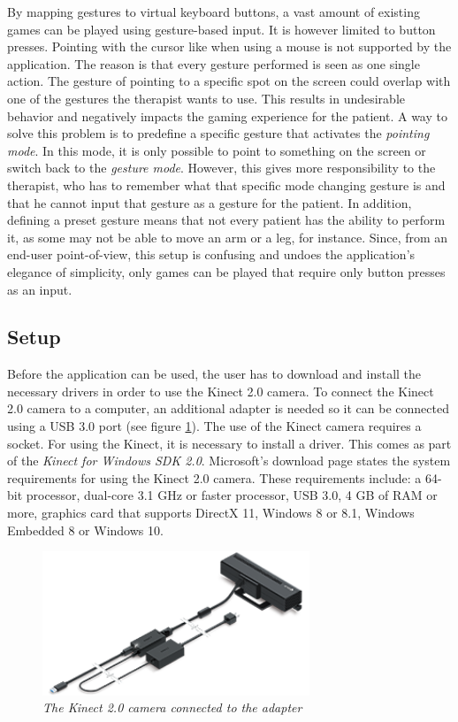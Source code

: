 By mapping gestures to virtual keyboard buttons, a vast amount of existing games can be played using gesture-based input. It is however limited to button presses. Pointing with the cursor like when using a mouse is not supported by the application. The reason is that every gesture performed is seen as one single action. The gesture of pointing to a specific spot on the screen could overlap with one of the gestures the therapist wants to use. This results in undesirable behavior and negatively impacts the gaming experience for the patient. A way to solve this problem is to predefine a specific gesture that activates the \emph{pointing mode}. In this mode, it is only possible to point to something on the screen or switch back to the \emph{gesture mode}. However, this gives more responsibility to the therapist, who has to remember what that specific mode changing gesture is and that he cannot input that gesture as a gesture for the patient. In addition, defining a preset gesture means that not every patient has the ability to perform it, as some may not be able to move an arm or a leg, for instance. Since, from an end-user point-of-view, this setup is confusing and undoes the application's elegance of simplicity, only games can be played that require only button presses as an input.\\


\subsection{Setup}

Before the application can be used, the user has to download and install the necessary drivers in order to use the Kinect 2.0 camera. To connect the Kinect 2.0 camera to a computer, an additional adapter is needed so it can be connected using a USB 3.0 port (see figure \ref{fig: kinect}). The use of the Kinect camera requires a socket. For using the Kinect, it is necessary to install a driver. This comes as part of the \emph{Kinect for Windows SDK 2.0}. Microsoft's download page \cite{KinectSDK} states the system requirements for using the Kinect 2.0 camera. These requirements include: a 64-bit processor, dual-core 3.1 GHz or faster processor, USB 3.0, 4 GB of RAM or more, graphics card that supports DirectX 11, Windows 8 or 8.1, Windows Embedded 8 or Windows 10.\\

\begin{figure}[H]
\begin{center}
\includegraphics[width=8cm]{KinectAdapter.png}
\caption{\emph{The Kinect 2.0 camera connected to the adapter}}
\label{fig: kinect}
\end{center}
\end{figure}

